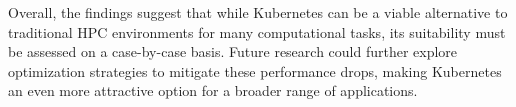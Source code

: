 Overall, the findings suggest that while Kubernetes can be a viable alternative
to traditional HPC environments for many computational tasks, its suitability
must be assessed on a case-by-case basis.
Future research could further explore optimization strategies to mitigate these
performance drops, making Kubernetes an even more attractive option for a
broader range of applications.
